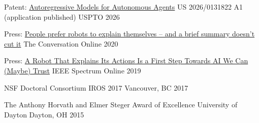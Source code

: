 




\begin{cvhonors}


\cvhonor
{Patent: \href{https://mjedmonds.com/papers/US20260131822A1.pdf}{Autoregressive Models for Autonomous Agents}} %
{US 2026/0131822 A1 (application published)} %
{USPTO} %
{2026} %


\cvhonor
{Press: \href{https://theconversation.com/people-prefer-robots-to-explain-themselves-and-a-brief-summary-doesnt-cut-it-129431}{People prefer robots to explain themselves – and a brief summary doesn’t cut it}} %
{The Conversation} %
{Online} %
{2020} %


\cvhonor
{Press: \href{https://spectrum.ieee.org/automaton/robotics/artificial-intelligence/a-robot-that-explains-its-actions}{A Robot That Explains Its Actions Is a First Step Towards AI We Can (Maybe) Trust}} %
{IEEE Spectrum} %
{Online} %
{2019} %


\cvhonor
{NSF Doctoral Consortium} %
{IROS 2017} %
{Vancouver, BC} %
{2017} %


\cvhonor
{The Anthony Horvath and Elmer Steger Award of Excellence} %
{University of Dayton} %
{Dayton, OH} %
{2015} %



\end{cvhonors}
